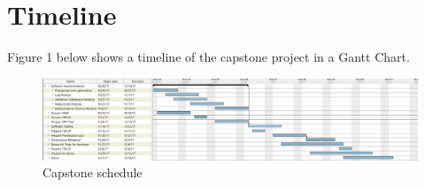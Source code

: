 \documentclass[paper=usletter, fontsize=12pt]{article}
\begin{document}
\section{Timeline}Figure 1 below shows a timeline of the capstone project in a Gantt Chart. \\

\begin{figure}[h]
	\includegraphics[scale=0.45]{gnatt_chart}
	\caption{Capstone schedule}

\end{figure}
\end{document}
